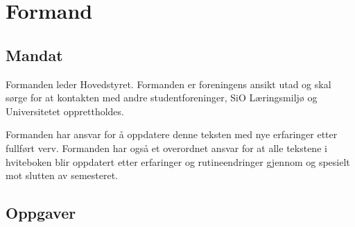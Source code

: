 \section{Formand}

\subsection{Mandat}
Formanden leder Hovedstyret. Formanden er foreningens ansikt utad og skal sørge for at
kontakten med andre studentforeninger, SiO Læringsmiljø og Universitetet opprettholdes.

Formanden har ansvar for å oppdatere denne teksten med nye erfaringer etter fullført verv.
Formanden har også et overordnet ansvar for at alle tekstene i hviteboken blir oppdatert
etter erfaringer og rutineendringer gjennom og spesielt mot slutten av semesteret.


\subsection{Oppgaver}

